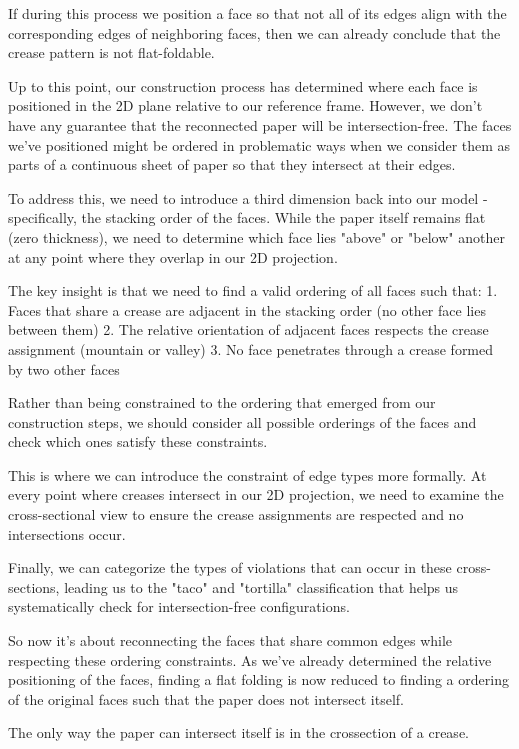If during this process we position a face so that not all of its edges align with the corresponding edges of neighboring
faces, then we can already conclude that the crease pattern is not flat-foldable.

Up to this point, our construction process has determined where each face is positioned in the 2D plane relative to our reference frame.
However, we don't have any guarantee that the reconnected paper will be intersection-free.
The faces we've positioned might be ordered in problematic ways when we consider them as parts of a continuous sheet of paper so that they intersect at their edges.

To address this, we need to introduce a third dimension back into our model - specifically, the stacking order of the faces. While the paper itself remains flat (zero thickness), we need to determine which face lies "above" or "below" another at any point where they overlap in our 2D projection.

The key insight is that we need to find a valid ordering of all faces such that:
1. Faces that share a crease are adjacent in the stacking order (no other face lies between them)
2. The relative orientation of adjacent faces respects the crease assignment (mountain or valley)
3. No face penetrates through a crease formed by two other faces

Rather than being constrained to the ordering that emerged from our construction steps, we should consider all possible orderings of the faces and check which ones satisfy these constraints.

This is where we can introduce the constraint of edge types more formally. At every point where creases intersect in our 2D projection, we need to examine the cross-sectional view to ensure the crease assignments are respected and no intersections occur.

Finally, we can categorize the types of violations that can occur in these cross-sections, leading us to the "taco" and "tortilla" classification that helps us systematically check for intersection-free configurations.

So now it's about reconnecting the faces that share common edges while respecting these ordering constraints.
As we've already determined the relative positioning of the faces, finding a flat folding is now reduced
to finding a ordering of the original faces such that the paper does not intersect itself.

The only way the paper can intersect itself is in the crossection of a crease.


